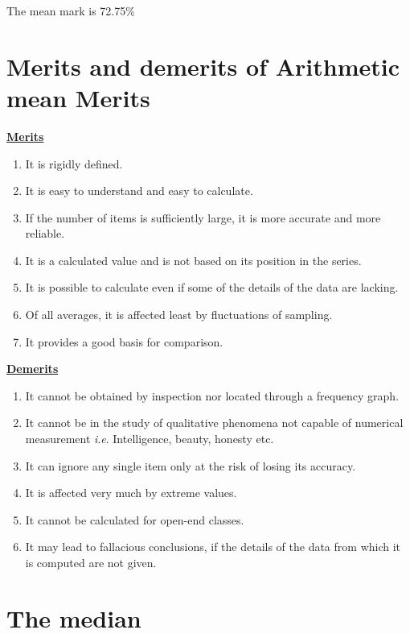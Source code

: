\documentclass[
]{book}
\begin{document}
The mean mark is 72.75\%

\hypertarget{merits-and-demerits-of-arithmetic-mean-merits}{%
\section{Merits and demerits of Arithmetic mean Merits}\label{merits-and-demerits-of-arithmetic-mean-merits}}

\underline{\textbf{Merits }}

\begin{enumerate}
\def\labelenumi{\arabic{enumi}.}
\item
  It is rigidly defined.
\item
  It is easy to understand and easy to calculate.
\item
  If the number of items is sufficiently large, it is more accurate
  and more reliable.
\item
  It is a calculated value and is not based on its position in the
  series.
\item
  It is possible to calculate even if some of the details of the data
  are lacking.
\item
  Of all averages, it is affected least by fluctuations of sampling.
\item
  It provides a good basis for comparison.
\end{enumerate}

\underline{\textbf{Demerits}}

\begin{enumerate}
\def\labelenumi{\arabic{enumi}.}
\item
  It cannot be obtained by inspection nor located through a frequency
  graph.
\item
  It cannot be in the study of qualitative phenomena not capable of
  numerical measurement \emph{i}.\emph{e}. Intelligence, beauty, honesty etc.
\item
  It can ignore any single item only at the risk of losing its
  accuracy.
\item
  It is affected very much by extreme values.
\item
  It cannot be calculated for open-end classes.
\item
  It may lead to fallacious conclusions, if the details of the data
  from which it is computed are not given.
\end{enumerate}

\hypertarget{the-median}{%
\section{The median}\label{the-median}}
\end{document}

